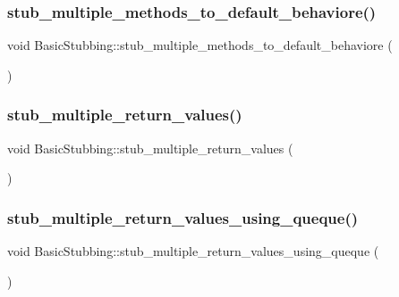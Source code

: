\subsubsection{\texorpdfstring{stub\_multiple\_methods\_to\_default\_behaviore()}{stub\_multiple\_methods\_to\_default\_behaviore()}}
{\footnotesize\ttfamily void Basic\+Stubbing\+::stub\+\_\+multiple\+\_\+methods\+\_\+to\+\_\+default\+\_\+behaviore (\begin{DoxyParamCaption}{ }\end{DoxyParamCaption})\hspace{0.3cm}{\ttfamily [inline]}}

\mbox{\label{structBasicStubbing_a393c44c8849198997289232d5715d351}} 
\subsubsection{\texorpdfstring{stub\_multiple\_return\_values()}{stub\_multiple\_return\_values()}}
{\footnotesize\ttfamily void Basic\+Stubbing\+::stub\+\_\+multiple\+\_\+return\+\_\+values (\begin{DoxyParamCaption}{ }\end{DoxyParamCaption})\hspace{0.3cm}{\ttfamily [inline]}}

\mbox{\label{structBasicStubbing_a52e1695c2f453da30bd8600b2e6eabb5}} 
\subsubsection{\texorpdfstring{stub\_multiple\_return\_values\_using\_queque()}{stub\_multiple\_return\_values\_using\_queque()}}
{\footnotesize\ttfamily void Basic\+Stubbing\+::stub\+\_\+multiple\+\_\+return\+\_\+values\+\_\+using\+\_\+queque (\begin{DoxyParamCaption}{ }\end{DoxyParamCaption})\hspace{0.3cm}{\ttfamily [inline]}}

